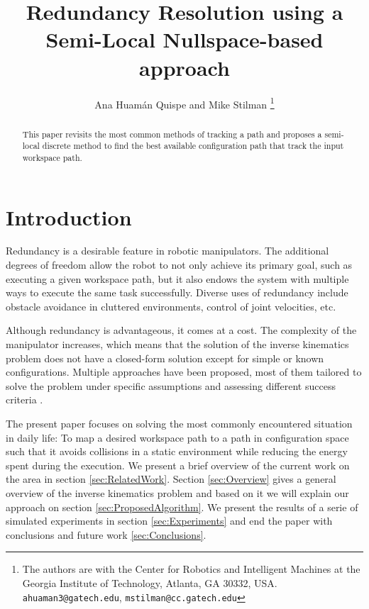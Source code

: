 \documentclass[conference]{IEEEtran}
\begin{document}
\title{Redundancy Resolution using a Semi-Local Nullspace-based approach}
\author{Ana Huam\'an Quispe and Mike Stilman%
  \thanks{The authors are with the Center for Robotics and Intelligent
    Machines at the Georgia Institute of Technology, Atlanta, GA
    30332, USA. {\tt\small ahuaman3@gatech.edu}, {\tt\small mstilman@cc.gatech.edu}}}
\maketitle

\begin{abstract}
This paper revisits the most common methods of tracking a path and 
proposes a semi-local discrete method to find the best available
configuration path that track the input workspace path.
\end{abstract}

\section{Introduction}
Redundancy is a desirable feature in robotic manipulators. The 
additional degrees of freedom allow the robot to not only achieve
its primary goal, such as executing a given workspace path, but 
it also endows the system with multiple ways to execute the same 
task successfully. Diverse uses of redundancy include obstacle 
avoidance in cluttered environments, control of joint velocities,
etc.

Although redundancy is advantageous, it comes at a
 cost. The complexity of the manipulator increases, which means
that the solution of the inverse kinematics problem does not have
a closed-form solution except for simple or known configurations.
Multiple approaches have been proposed, most of them tailored to
solve the problem under specific assumptions and assessing different
success criteria \cite{hooper-ns-1995}. 

The present paper focuses on solving the most commonly encountered
situation in daily life: To map a desired workspace path to a path in
configuration space such that it avoids collisions in a static
environment while reducing the energy spent during the execution. We
present a brief overview of the current work on the area in section 
\ref{sec:RelatedWork}. Section \ref{sec:Overview} gives a general overview of
the inverse kinematics problem and based on it we will explain our
approach on section \ref{sec:ProposedAlgorithm}. We present the 
results of a serie of simulated experiments in section \ref{sec:Experiments}
and end the paper with conclusions and future work \ref{sec:Conclusions}.
\end{document}
